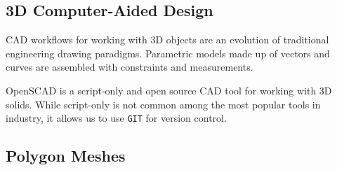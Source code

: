\documentclass[sigconf,]{acmart}
\begin{document}






\subsection{3D Computer-Aided Design}

CAD workflows for working with 3D objects are an evolution of traditional engineering drawing paradigms.
Parametric models made up of vectors and curves are assembled with constraints and measurements.

OpenSCAD is a script-only and open source CAD tool for working with 3D solids.
While script-only is not common among the most popular tools in industry, it allows us to use \texttt{GIT} for version control.


\subsection{Polygon Meshes}
\end{document}
